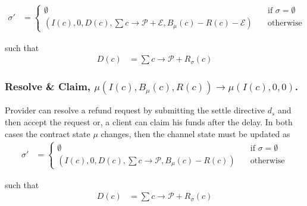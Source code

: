 \documentclass{llncs}
\begin{document}
\begin{equation*}
\begin{split}
  \sigma' &=
  \begin{cases}
      \emptyset & \quad \text{if } \sigma = \emptyset \\
      (I(c), 0, D(c), \textstyle \sum c \rightarrow \mathcal{P} + \mathcal{E},B_\mu(c) - R(c) - \mathcal{E}) & \quad \text{otherwise}
  \end{cases}
\end{split}
\end{equation*}

such that
\begin{equation*}
\begin{split}
    D(c) &= \textstyle\sum c \rightarrow \mathcal{P} + R_\sigma(c)
\end{split}
\end{equation*}

\subsubsection{Resolve \& Claim, $\mu(I(c), B_\mu(c), R(c)) \rightarrow \mu(I(c), 0, 0)$.} Provider can resolve a refund request by submitting the settle directive $d_s$ and then accept the request or, a client can claim his funds after the delay. In both cases the contract state $\mu$ changes, then the channel state must be updated as
\begin{equation*}
\begin{split}
  \sigma' &=
  \begin{cases}
      \emptyset & \quad \text{if } \sigma = \emptyset \\
      (I(c), 0, D(c), \textstyle \sum c \rightarrow \mathcal{P},B_\mu(c) - R(c)) & \quad \text{otherwise}
  \end{cases}
\end{split}
\end{equation*}

such that
\begin{equation*}
\begin{split}
    D(c) &= \textstyle\sum c \rightarrow \mathcal{P} + R_\sigma(c)
\end{split}
\end{equation*}
\end{document}
